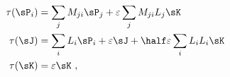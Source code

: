 \begin{equation}
  \label{eq:autos}
  \begin{split}
    \tau(\sP_i) &= \sum_j M_{ji} \sP_j + \varepsilon \sum_j M_{ji} L_j
    \sK\\
    \tau(\sJ) &= \sum_i L_i \sP_i + \varepsilon \sJ + \half
    \varepsilon \sum_i L_i L_i \sK\\
    \tau(\sK) &= \varepsilon \sK~,
  \end{split}
\end{equation}


